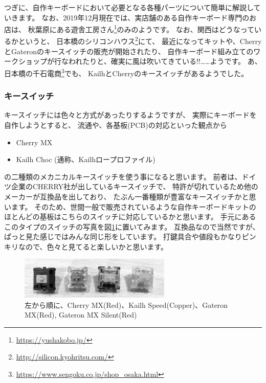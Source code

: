 \documentclass[mingoth,a4paper]{jsarticle}
\begin{document}
つぎに、自作キーボードにおいて必要となる各種パーツについて簡単に解説していきます。
なお、2019年12月現在では、実店舗のある自作キーボード専門のお店は、
秋葉原にある遊舎工房さん\footnote{\url{https://yushakobo.jp/}}のみのようです。
なお、関西はどうなっているかというと、
日本橋のシリコンハウス\footnote{\url{http://silicon.kyohritsu.com/}}にて、
最近になってキットや、CherryとGateronのキースイッチの販売が開始されたり、
自作キーボード組み立てのワークショップが行なわれたりと、確実に風は吹いてきている!!……ようです。
あ、日本橋の千石電商\footnote{\url{https://www.sengoku.co.jp/shop_osaka.html}}でも、
KailhとCherryのキースイッチがあるようでした。

\subsubsection*{キースイッチ}

キースイッチには色々と方式があったりするようですが、
実際にキーボードを自作しようとすると、
流通や、各基板(PCB)の対応といった観点から

\begin{itemize}
 \item Cherry MX
 \item Kailh Choc (通称、Kailhロープロファイル)
\end{itemize}

の二種類のメカニカルキースイッチを使う事になると思います。
前者は、ドイツ企業のCHERRY社が出しているキースイッチで、
特許が切れているため他のメーカーが互換品を出しており、
たぶん一番種類が豊富なキースイッチかと思います。
そのため、世間一般で販売されているような自作キーボードキットの
ほとんどの基板はこちらのスイッチに対応しているかと思います。
手元にあるこのタイプのスイッチの写真を図\ref{fig:cherry-compat}に置いてみます。
互換品なので当然ですが、ぱっと見た感じではみんな同じ形をしています。
打鍵具合や値段もかなりピンキリなので、色々と見てると楽しいかと思います。

\begin{figure}[htbp]
 \begin{center}
  \includegraphics[keepaspectratio,height=2cm]{./image201911-kansai-02/cherry-compat.jpg}
 \end{center}
 \vspace*{-1zw}
 \caption{左から順に、Cherry MX(Red)、Kailh Speed(Copper)、Gateron MX(Red), Gateron MX Silent(Red)}
 \label{fig:cherry-compat}
\end{figure}
\end{document}
